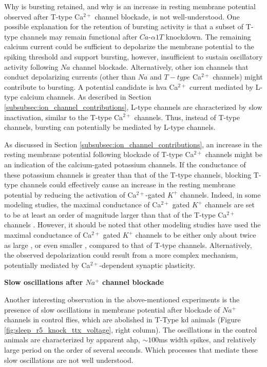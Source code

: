 \documentclass[../main.tex]{subfiles}
\begin{document}
Why is bursting retained, and why is an increase in resting membrane potential observed after T-type Ca$^{2+}$ channel blockade, is not well-understood. One possible explanation for the retention of bursting activity is that a subset of T-type channels may remain functional after $Ca$-$\alpha1T$ knockdown. The remaining calcium current could be sufficient to depolarize the membrane potential to the spiking threshold and support bursting, however, insufficient to sustain oscillatory activity following $Na$ channel blockade. Alternatively, other ion channels that conduct depolarizing currents (other than $Na$ and $T-type$ Ca$^{2+}$ channels) might contribute to bursting. A potential candidate is \gls{hva} Ca$^{2+}$ current mediated by L-type calcium channels. As described in Section \ref{subsubsec:ion_channel_contributions}, L-type channels are characterized by slow inactivation, similar to the T-type Ca$^{2+}$ channels. Thus, instead of T-type channels, bursting can potentially be mediated by L-type channels.

As discussed in Section \ref{subsubsec:ion_channel_contributions}, an increase in the resting membrane potential following blockade of T-type Ca$^{2+}$ channels might be an indication of the calcium-gated potassium channels. If the conductance of these potassium channels is greater than that of the T-type channels, blocking T-type channels could
effectively cause an increase in the resting membrane potential by reducing the activation of Ca$^{2+}$-gated $K^+$ channels. Indeed, in some modeling studies, the maximal conductance of
Ca$^{2+}$ gated $K^+$ channels are set to be at least an order of magnitude larger than that of the
T-type Ca$^{2+}$ channels \parencite{franciRobustTunableBursting2018,nowotnyProbingDynamicsIdentified2008}. However, it should be noted that other modeling studies have used the maximal conductance of Ca$^{2+}$ gated $K^+$ channels to be either only about twice as large \parencite{alonsoVisualizationCurrentsNeural2019}, or even smaller \parencite{parkMathematicalModelSubthalamic2021}, compared to that of T-type channels.
Alternatively, the observed depolarization could result from a more complex mechanism, potentially mediated by Ca$^{2+}$-dependent synaptic plasticity.

\vspace*{0.3cm}
\noindent\textbf{Slow oscillations after $Na^+$ channel blockade}

Another interesting observation in the above-mentioned experiments is the presence of slow oscillations in membrane potential after blockade of $Na^+$ channels in control flies, which are abolished in T-Type \gls{kd} animals (Figure \ref{fig:sleep_r5_knock_ttx_voltage}, right column). The oscillations in the control animals are characterized by apparent \gls{ahp}, $\sim100$ms width spikes, and relatively large period on the order of several seconds. Which processes that mediate these slow oscillations are not well understood.
\end{document}

